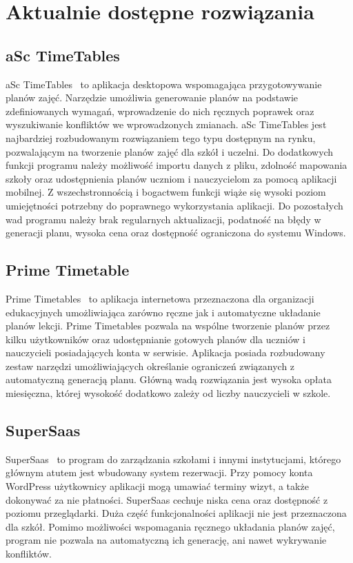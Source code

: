 \section{Aktualnie dostępne rozwiązania}
\subsection{aSc TimeTables}
aSc TimeTables~\cite{asc} to aplikacja desktopowa wspomagająca przygotowywanie planów zajęć. Narzędzie umożliwia generowanie planów na podstawie zdefiniowanych wymagań, wprowadzenie do nich ręcznych poprawek oraz wyszukiwanie konfliktów we wprowadzonych zmianach. aSc TimeTables jest najbardziej rozbudowanym rozwiązaniem tego typu dostępnym na rynku, pozwalającym na tworzenie planów zajęć dla szkół i uczelni. Do dodatkowych funkcji programu należy możliwość importu danych z pliku, zdolność mapowania szkoły oraz udostępnienia planów uczniom i nauczycielom za pomocą aplikacji mobilnej. Z wszechstronnością i bogactwem funkcji wiąże się wysoki poziom umiejętności potrzebny do poprawnego wykorzystania aplikacji. Do pozostałych wad programu należy brak regularnych aktualizacji, podatność na błędy w generacji planu, wysoka cena oraz dostępność ograniczona do systemu Windows.
\subsection{Prime Timetable}
Prime Timetables~\cite{prime} to aplikacja internetowa przeznaczona dla organizacji edukacyjnych umożliwiająca zarówno ręczne jak i automatyczne układanie planów lekcji. Prime Timetables pozwala na wspólne tworzenie planów przez kilku użytkowników oraz udostępnianie gotowych planów dla uczniów i nauczycieli posiadających konta w serwisie. Aplikacja posiada rozbudowany zestaw narzędzi umożliwiających określanie ograniczeń związanych z automatyczną generacją planu. Główną wadą rozwiązania jest wysoka opłata miesięczna, której wysokość dodatkowo zależy od liczby nauczycieli w szkole. 
\subsection{SuperSaas}
SuperSaas~\cite{saas} to program do zarządzania szkołami i innymi instytucjami, którego głównym atutem jest wbudowany system rezerwacji. Przy pomocy konta WordPress użytkownicy aplikacji mogą umawiać terminy wizyt, a także dokonywać za nie płatności. SuperSaas cechuje niska cena oraz dostępność z poziomu przeglądarki. Duża część funkcjonalności aplikacji nie jest przeznaczona dla szkół. Pomimo możliwości wspomagania ręcznego układania planów zajęć, program nie pozwala na automatyczną ich generację, ani nawet wykrywanie konfliktów. 
